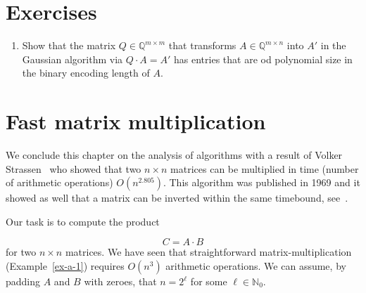 \section*{Exercises} 
\label{sec:exercises}

\begin{enumerate}
\item \label{item:3} Show that the matrix $Q ∈ ℚ^{m × m}$ that transforms $A \in ℚ^{m × n}$ into $A'$ in the Gaussian algorithm via $Q ⋅A = A'$ has entries that are od polynomial size in the binary encoding length of $A$. 
\end{enumerate}


\section{Fast matrix multiplication} 
\label{sec:fast-matr-mult}


We conclude this chapter on the analysis of algorithms with a result
of Volker Strassen~\cite{strassen1969gaussian} who showed that two
$n ×n$
matrices can be multiplied in time (number of arithmetic operations)
$O(n^{2.805})$.
This algorithm was published in 1969 and it showed as well that a
matrix can be inverted within the same timebound, see~\cite{AHU74}. 

Our task is to compute the product 

\begin{equation}
  \label{eq:str:1}
C =   A \cdot B  
\end{equation}
for two $n ×n$ matrices. We have seen that straightforward matrix-multiplication (Example~\ref{ex-a-1}) requires $O(n^3)$ arithmetic operations. 
We can assume, by padding $A$ and $B$ with zeroes, that $n = 2^\ell$ for some $\ell ∈ ℕ_0$. 

